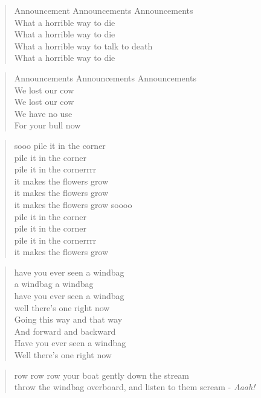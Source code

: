 
\begin{verse}
Announcement Announcements Announcements \\
What a horrible way to die \\
What a horrible way to die \\
What a horrible way to talk to death \\
What a horrible way to die \\
\end{verse}

\begin{verse}
Announcements Announcements Announcements \\
We lost our cow \\
We lost our cow \\
We have no use \\
For your bull now \\
\end{verse}

\begin{verse}
sooo pile it in the corner \\
pile it in the corner \\
pile it in the cornerrrr \\
it makes the flowers grow \\
it makes the flowers grow \\
it makes the flowers grow soooo \\
pile it in the corner \\
pile it in the corner \\
pile it in the cornerrrr \\
it makes the flowers grow \\
\end{verse}

\begin{verse}
have you ever seen a windbag \\
a windbag a windbag \\
have you ever seen a windbag \\
well there's one right now \\
Going this way and that way \\
And forward and backward \\
Have you ever seen a windbag \\
Well there's one right now \\
\end{verse}

\begin{verse}
row row row your boat gently down the stream \\
throw the windbag overboard, and listen to them scream - \textit{Aaah!} \\
\end{verse}
